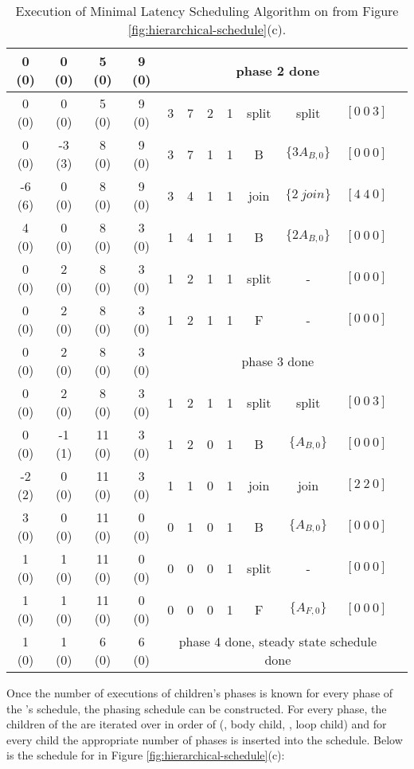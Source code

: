 \begin{table}
\begin{tabular}{|c|c|c|c|c|c|c|c|c|c|c|c|}
\hline 0 (0) & 0 (0) & 5 (0) & 9 (0) & \multicolumn{7}{|c|}{phase 2 done} \\

\hline 0 (0) & 0 (0) & 5 (0) & 9 (0) & 3 & 7 & 2 & 1 & split & split & $[0\ 0\ 3]$ \\
\hline 0 (0) & -3 (3) & 8 (0) & 9 (0) & 3 & 7 & 1 & 1 & B & $\{3A_{B,0}\}$ & $[0\ 0\ 0]$ \\
\hline -6 (6) & 0 (0) & 8 (0) & 9 (0) & 3 & 4 & 1 & 1 & join & $\{2\ join\}$ & $[4\ 4\ 0]$ \\
\hline 4 (0) & 0 (0) & 8 (0) & 3 (0) & 1 & 4 & 1 & 1 & B & $\{2A_{B,0}\}$ & $[0\ 0\ 0]$ \\
\hline 0 (0) & 2 (0) & 8 (0) & 3 (0) & 1 & 2 & 1 & 1 & split & - & $[0\ 0\ 0]$ \\
\hline 0 (0) & 2 (0) & 8 (0) & 3 (0) & 1 & 2 & 1 & 1 & F & - & $[0\ 0\ 0]$ \\

\hline 0 (0) & 2 (0) & 8 (0) & 3 (0) & \multicolumn{7}{|c|}{phase 3 done} \\

\hline 0 (0) & 2 (0) & 8 (0) & 3 (0) & 1 & 2 & 1 & 1 & split & split & $[0\ 0\ 3]$ \\
\hline 0 (0) & -1 (1) & 11 (0) & 3 (0) & 1 & 2 & 0 & 1 & B & $\{A_{B,0}\}$ & $[0\ 0\ 0]$ \\
\hline -2 (2) & 0 (0) & 11 (0) & 3 (0) & 1 & 1 & 0 & 1 & join & join & $[2\ 2\ 0]$ \\
\hline 3 (0) & 0 (0) & 11 (0) & 0 (0) & 0 & 1 & 0 & 1 & B & $\{A_{B,0}\}$ & $[0\ 0\ 0]$ \\
\hline 1 (0) & 1 (0) & 11 (0) & 0 (0) & 0 & 0 & 0 & 1 & split & - & $[0\ 0\ 0]$ \\
\hline 1 (0) & 1 (0) & 11 (0) & 0 (0) & 0 & 0 & 0 & 1 & F & $\{A_{F,0}\}$ & $[0\ 0\ 0]$ \\

\hline 1 (0) & 1 (0) & 6 (0) & 6 (0) & \multicolumn{7}{|c|}{phase 4 done, steady state schedule done} \\
\hline
\end{tabular}
\caption[Execution of Minimal Latency Scheduling Algorithm on a
{\feedbackloop}]{Execution of Minimal Latency Scheduling Algorithm
on {\feedbackloop} from Figure
\ref{fig:hierarchical-schedule}(c).} \label{tbl:min-lat-fl}
\end{table}

Once the number of executions of children's phases is known for
every phase of the {\feedbackloop}'s schedule, the phasing schedule
can be constructed.  For every phase, the children of the
{\feedbackloop} are iterated over in order of ({\joiner}, body child,
{\splitter}, loop child) and for every child the appropriate number
of phases is inserted into the schedule.  Below is the schedule
for {\feedbackloop} in Figure \ref{fig:hierarchical-schedule}(c):

